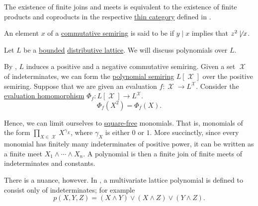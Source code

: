 \begin{remark}\label{rem:lattice_categorical_product}
  The existence of finite joins and meets is equivalent to the existence of finite products and coproducts in the respective \hyperref[def:thin_category]{thin category} defined in .
\end{remark}

\begin{definition}\label{def:square_free}
  An element \( x \) of a \hyperref[def:semiring/commutative]{commutative semiring} is said to be  if \( y \mid x \) implies that \( z^2 \not\mid x \).
\end{definition}

\begin{remark}\label{rem:lattice_polynomials}
  Let \( L \) be a \hyperref[def:semilattice/bounded]{bounded} \hyperref[def:semilattice/distributive_lattice]{distributive lattice}. We will discuss polynomials over \( L \).

  By , \( L \) induces a positive and a negative commutative semiring. Given a set \( \mscrX \) of indeterminates, we can form the \hyperref[def:polynomial_algebra]{polynomial semiring} \( L[\mscrX] \) over the positive semiring. Suppose that we are given an evaluation \( f: \mscrX \to L^\mscrX \). Consider the \hyperref[thm:polynomial_algebra_universal_property]{evaluation homomorphism} \( \Phi_f: L[\mscrX] \to L^\mscrX \).
  \begin{equation*}
    \Phi_f(X^2) = \Phi_f(X).
  \end{equation*}

  Hence, we can limit ourselves to \hyperref[def:square_free]{square-free} monomials. That is, monomials of the form \( \prod_{X \in \mscrX} X^{\gamma_X} \), where \( \gamma_X \) is either \( 0 \) or \( 1 \). More succinctly, since every monomial has finitely many indeterminates of positive power, it can be written as a finite meet \( X_1 \wedge \cdots \wedge X_n \). A polynomial is then a finite join of finite meets of indeterminates and constants.

  There is a nuance, however. In \cite[def. I.4.2]{Gratzer1978}, a multivariate lattice polynomial is defined to consist only of indeterminates; for example
  \begin{equation*}
    p(X, Y, Z) = (X \wedge Y) \vee (X \wedge Z) \vee (Y \wedge Z).
  \end{equation*}


\end{remark}

